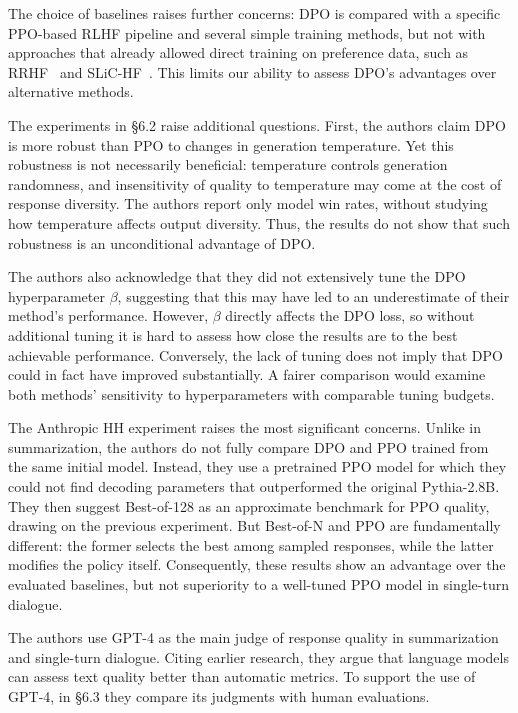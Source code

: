 \documentclass[11pt,a4paper]{article}
\theoremstyle{remark}
\begin{document}
The choice of baselines raises further concerns: DPO is compared with a specific PPO-based RLHF pipeline and several simple training methods, but not with approaches that already allowed direct training on preference data, such as RRHF~\cite{rrhf} and SLiC-HF~\cite{slic-hf}. This limits our ability to assess DPO's advantages over alternative methods.

The experiments in \S 6.2 raise additional questions. First, the authors claim DPO is more robust than PPO to changes in generation temperature. Yet this robustness is not necessarily beneficial: temperature controls generation randomness, and insensitivity of quality to temperature may come at the cost of response diversity. The authors report only model win rates, without studying how temperature affects output diversity. Thus, the results do not show that such robustness is an unconditional advantage of DPO.

The authors also acknowledge that they did not extensively tune the DPO hyperparameter $\beta$, suggesting that this may have led to an underestimate of their method's performance. However, $\beta$ directly affects the DPO loss, so without additional tuning it is hard to assess how close the results are to the best achievable performance. Conversely, the lack of tuning does not imply that DPO could in fact have improved substantially. A fairer comparison would examine both methods' sensitivity to hyperparameters with comparable tuning budgets.

The Anthropic HH experiment raises the most significant concerns. Unlike in summarization, the authors do not fully compare DPO and PPO trained from the same initial model. Instead, they use a pretrained PPO model for which they could not find decoding parameters that outperformed the original Pythia-2.8B. They then suggest Best-of-128 as an approximate benchmark for PPO quality, drawing on the previous experiment. But Best-of-N and PPO are fundamentally different: the former selects the best among sampled responses, while the latter modifies the policy itself. Consequently, these results show an advantage over the evaluated baselines, but not superiority to a well-tuned PPO model in single-turn dialogue.

The authors use GPT-4 as the main judge of response quality in summarization and single-turn dialogue. Citing earlier research, they argue that language models can assess text quality better than automatic metrics. To support the use of GPT-4, in \S 6.3 they compare its judgments with human evaluations.
\end{document}
